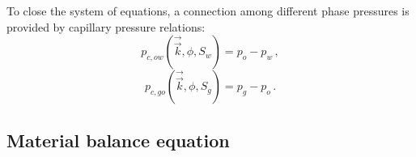 \documentclass[authoryear,preprint,review,11pt]{elsarticle}
\begin{document}
To close the system of equations, a connection among different phase pressures is provided by capillary pressure relations:
\begin{equation}\label{eq: capillary_ow}
p_{c,ow}\left(\vec{\vec{k}},\phi,S_w\right)=p_o-p_w \, ,
\end{equation}
\begin{equation}\label{eq: capillary_og}
p_{c,go}\left(\vec{\vec{k}},\phi,S_g\right)=p_g-p_o \, .
\end{equation}



%
%
%


\subsection{Material balance equation}
\end{document}
